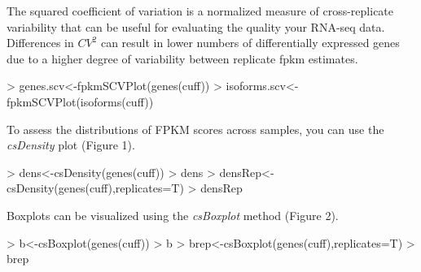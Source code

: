 \documentclass[10pt]{article}
\newcommand{\Rmethod}[1]{{\textit{#1}}}
\begin{document}
The squared coefficient of variation is a normalized measure of cross-replicate
variability that can be useful for evaluating the quality your RNA-seq data. 
Differences in $CV^2$ can result in lower numbers of differentially expressed
genes due to a higher degree of variability between replicate fpkm estimates.

\begin{Schunk}
\begin{Sinput}
> genes.scv<-fpkmSCVPlot(genes(cuff))
> isoforms.scv<-fpkmSCVPlot(isoforms(cuff))
\end{Sinput}
\end{Schunk}

\begin{figure}[htp]
	\begin{center}
	
	\end{center}
\end{figure}

To assess the distributions of FPKM scores across samples, you can use the \Rmethod{csDensity} plot (Figure 1).
\begin{Schunk}
\begin{Sinput}
> dens<-csDensity(genes(cuff))
> dens
> densRep<-csDensity(genes(cuff),replicates=T)
> densRep
\end{Sinput}
\end{Schunk}

\begin{figure}[htp]
	\begin{center}
	\qquad
	\end{center}
\end{figure}

Boxplots can be visualized using the \Rmethod{csBoxplot} method (Figure 2).
\begin{Schunk}
\begin{Sinput}
> b<-csBoxplot(genes(cuff))
> b
> brep<-csBoxplot(genes(cuff),replicates=T)
> brep
\end{Sinput}
\end{Schunk}
\end{document}
